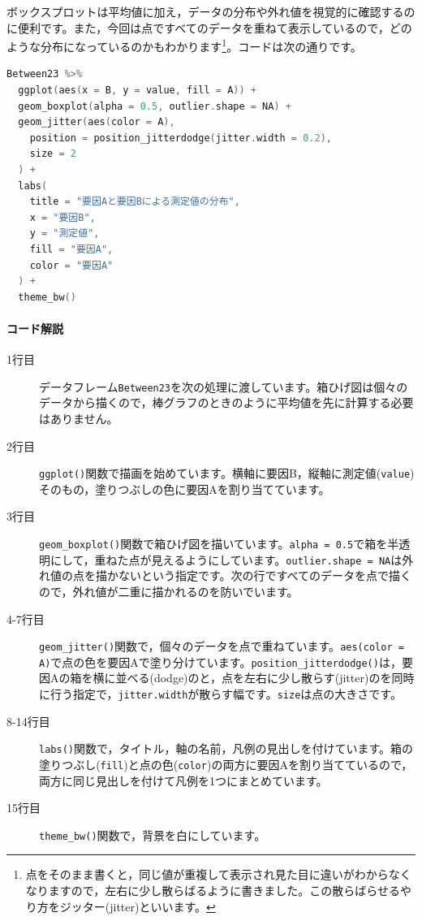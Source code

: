 \documentclass{ltjbook}
\begin{document}
ボックスプロットは平均値に加え，データの分布や外れ値を視覚的に確認するのに便利です。また，今回は点ですべてのデータを重ねて表示しているので，どのような分布になっているのかもわかります\footnote{点をそのまま書くと，同じ値が重複して表示され見た目に違いがわからなくなりますので，左右に少し散らばるように書きました。この散らばらせるやり方をジッター(jitter)といいます。}。コードは次の通りです。

\begin{lstlisting}[language=c++,label={code:20_10},caption={箱ひげ図のコード}]
Between23 %>%
  ggplot(aes(x = B, y = value, fill = A)) +
  geom_boxplot(alpha = 0.5, outlier.shape = NA) +
  geom_jitter(aes(color = A),
    position = position_jitterdodge(jitter.width = 0.2),
    size = 2
  ) +
  labs(
    title = "要因Aと要因Bによる測定値の分布",
    x = "要因B",
    y = "測定値",
    fill = "要因A",
    color = "要因A"
  ) +
  theme_bw()
\end{lstlisting}
\paragraph{コード解説}
\begin{description}
	\item[1行目] データフレーム\texttt{Between23}を次の処理に渡しています。箱ひげ図は個々のデータから描くので，棒グラフのときのように平均値を先に計算する必要はありません。
	\item[2行目] \verb|ggplot()|関数で描画を始めています。横軸に要因B，縦軸に測定値(\texttt{value})そのもの，塗りつぶしの色に要因Aを割り当てています。
	\item[3行目] \verb|geom_boxplot()|関数で箱ひげ図を描いています。\verb|alpha = 0.5|で箱を半透明にして，重ねた点が見えるようにしています。\verb|outlier.shape = NA|は外れ値の点を描かないという指定です。次の行ですべてのデータを点で描くので，外れ値が二重に描かれるのを防いでいます。
	\item[4-7行目] \verb|geom_jitter()|関数で，個々のデータを点で重ねています。\verb|aes(color = A)|で点の色を要因Aで塗り分けています。\verb|position_jitterdodge()|は，要因Aの箱を横に並べる(dodge)のと，点を左右に少し散らす(jitter)のを同時に行う指定で，\verb|jitter.width|が散らす幅です。\verb|size|は点の大きさです。
	\item[8-14行目] \verb|labs()|関数で，タイトル，軸の名前，凡例の見出しを付けています。箱の塗りつぶし(\texttt{fill})と点の色(\texttt{color})の両方に要因Aを割り当てているので，両方に同じ見出しを付けて凡例を1つにまとめています。
	\item[15行目] \verb|theme_bw()|関数で，背景を白にしています。
\end{description}
\end{document}
